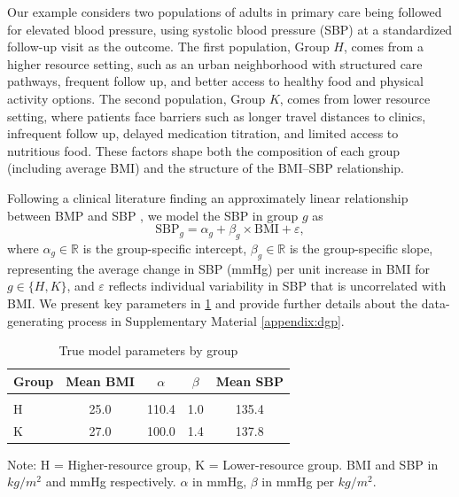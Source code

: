 Our example considers two populations of adults in primary care being followed for elevated blood pressure, using systolic blood pressure (SBP) at a standardized follow-up visit as the outcome.
The first population, Group $H$, comes from a higher resource setting, such as an urban neighborhood with structured care pathways, frequent follow up, and better access to healthy food and physical activity options. 
The second population, Group $K$, comes from lower resource setting, where patients face barriers such as longer travel distances to clinics, infrequent follow up, delayed medication titration, and limited access to nutritious food. 
These factors shape both the composition of each group (including average BMI) and the structure of the BMI–SBP relationship.

Following a clinical literature finding an approximately linear relationship between BMP and SBP \cite{kaufman1997, cappuccio2008, chen2023}, we model the SBP in group \( g \) as
\begin{equation}
    \label{eq:linear_model}
    \text{SBP}_g = \alpha_g + \beta_g \times \text{BMI} + \varepsilon,
\end{equation}
where $\alpha_g \in \mathbb{R}$ is the group-specific intercept, $\beta_g \in \mathbb{R}$ is the group-specific slope, representing the average change in SBP (mmHg) per unit increase in BMI for $g \in \{H, K\}$, and $\varepsilon$ reflects individual variability in SBP that is uncorrelated with BMI.
We present key parameters in \cref{tab:dgp_short} and provide further details about the data-generating process in Supplementary Material \ref{appendix:dgp}.

\begin{table}[h]
\caption{True model parameters by group}
\label{tab:dgp_short}
\begin{center}
\small
\begin{tabular}{lcccc}
\textbf{Group} & \textbf{Mean BMI} & \textbf{$\alpha$} & \textbf{$\beta$} & \textbf{Mean SBP} \\
\hline \\
H & 25.0 & 110.4 & 1.0 & 135.4 \\
K & 27.0 & 100.0 & 1.4 & 137.8 \\
\end{tabular}
\end{center}
\footnotesize{Note: H = Higher-resource group, K = Lower-resource group. BMI and SBP in $kg/m^2$ and mmHg respectively. $\alpha$ in mmHg, $\beta$ in mmHg per $kg/m^2$.}
\end{table}

